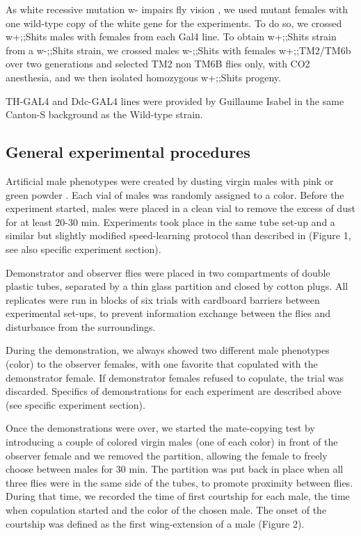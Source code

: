 \documentclass[a4paper, 12pt]{article}
\begin{document}
	As white recessive mutation w- impairs fly vision \parencite{gotz_optomotorische_1964}, we used mutant females with one wild-type copy of the white gene for the experiments. To do so, we crossed w+;;Shits males with females from each Gal4 line. To obtain w+;;Shits strain from a w-;;Shits strain, we crossed males w-;;Shits with females w+;;TM2/TM6b over two generations and selected TM2 non TM6B flies only, with CO2 anesthesia, and we then isolated homozygous w+;;Shits progeny.
	
	TH-GAL4 and Ddc-GAL4 lines were provided by Guillaume Isabel in the same Canton-S background as the Wild-type strain.
	
	\subsection{General experimental procedures}
	
	Artificial male phenotypes were created by dusting virgin males with pink or green powder \parencite{mery_public_2009}. Each vial of males was randomly assigned to a color. Before the experiment started, males were placed in a clean vial to remove the excess of dust for at least 20-30 min. Experiments took place in the same tube set-up and a similar but slightly modified speed-learning protocol than described in \textcite{dagaeff_drosophila_2016} (Figure 1, see also specific experiment section).
	
	Demonstrator and observer flies were placed in two compartments of double plastic tubes, separated by a thin glass partition and closed by cotton plugs. All replicates were run in blocks of six trials with cardboard barriers between experimental set-ups, to prevent information exchange between the flies and disturbance from the surroundings. 
	
	During the demonstration, we always showed two different male phenotypes (color) to the observer females, with one favorite that copulated with the demonstrator female. If demonstrator females refused to copulate, the trial was discarded. Specifics of demonstrations for each experiment are described above (see specific experiment section).
	
	Once the demonstrations were over, we started the mate-copying test by introducing a couple of colored virgin males (one of each color) in front of the observer female and we removed the partition, allowing the female to freely choose between males for 30 min. The partition was put back in place when all three flies were in the same side of the tubes, to promote proximity between flies. During that time, we recorded the time of first courtship for each male, the time when copulation started and the color of the chosen male. The onset of the courtship was defined as the first wing-extension of a male (Figure 2).
\end{document}
